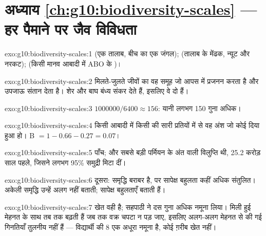 \section*{अध्याय \ref{ch:g10:biodiversity-scales} --- हर पैमाने पर जैव विविधता}

\begin{solution}{exo:g10:biodiversity-scales:1}
 (एक तालाब, बीच का एक जंगल);  (तालाब के मेंढक, न्यूट
और नरकट);  (किसी मानव आबादी में ABO  के )।
\end{solution}

\begin{solution}{exo:g10:biodiversity-scales:2}
मिलते-जुलते जीवों का वह समूह जो आपस में प्रजनन करता है और उपजाऊ संतान
देता है। शेर और बाघ बंध्य संकर देते हैं, इसलिए वे दो  हैं।
\end{solution}

\begin{solution}{exo:g10:biodiversity-scales:3}
$\num{1000000}/6400 \approx 156$: यानी लगभग 150 गुना अधिक।
\end{solution}

\begin{solution}{exo:g10:biodiversity-scales:4}
किसी आबादी में किसी  की सारी प्रतियों में से वह अंश जो कोई दिया हुआ
 हो। B $= 1 - 0.66 - 0.27 = 0.07$।
\end{solution}

\begin{solution}{exo:g10:biodiversity-scales:5}
पाँच; और सबसे बड़ी पर्मियन के अंत वाली विलुप्ति थी, 25.2 करोड़ साल पहले,
जिसने लगभग 95\% समुद्री  मिटा दीं।
\end{solution}

\begin{solution}{exo:g10:biodiversity-scales:6}
दूसरा: समृद्धि बराबर है, पर सापेक्ष बहुलता कहीं अधिक संतुलित। अकेली
समृद्धि उन्हें अलग नहीं बताती; सापेक्ष बहुलताएँ बताती हैं।
\end{solution}

\begin{solution}{exo:g10:biodiversity-scales:7}
खेत वही है; सहपाठी ने दस गुना अधिक नमूना लिया। मिली हुई  मेहनत
के साथ तब तक बढ़ती हैं जब तक वक्र चपटा न पड़ जाए, इसलिए अलग-अलग मेहनत से
की गई गिनतियाँ तुलनीय नहीं हैं --- विद्यार्थी की 8 एक अधूरा नमूना है,
कोई ग़रीब खेत नहीं।
\end{solution}

